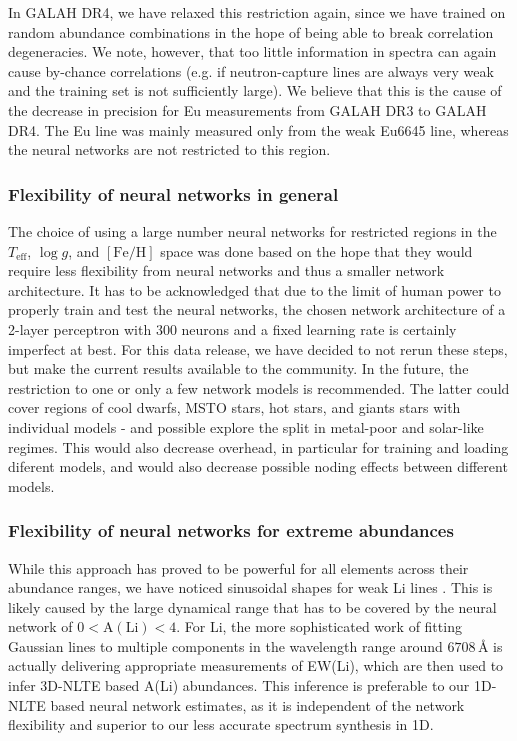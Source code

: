 \documentclass[
  journal=pasa,
  manuscript=research-paper, %
  year=2023,
  volume=37
]{cup-journal}
\newcommand{\Teff}{$T_\mathrm{eff}$\xspace}
\newcommand{\logg}{$\log g$\xspace}
\newcommand{\feh}{$\mathrm{[Fe/H]}$\xspace}
\newcommand{\TLF}{\Teff, \logg, and \feh}
\begin{document}
In GALAH DR4, we have relaxed this restriction again, since we have trained on random abundance combinations in the hope of being able to break correlation degeneracies. We note, however, that too little information in spectra can again cause by-chance correlations (e.g. if neutron-capture lines are always very weak and the training set is not sufficiently large). We believe that this is the cause of the decrease in precision for Eu measurements from GALAH DR3 to GALAH DR4. The Eu line was mainly measured only from the weak Eu6645 line, whereas the neural networks are not restricted to this region.

\subsubsection{Flexibility of neural networks in general}

The choice of using a large number neural networks for restricted regions in the \TLF space was done based on the hope that they would require less flexibility from neural networks and thus a smaller network architecture. It has to be acknowledged that due to the limit of human power to properly train and test the neural networks, the chosen network architecture of a 2-layer perceptron with 300 neurons and a fixed learning rate is certainly imperfect at best. For this data release, we have decided to not rerun these steps, but make the current results available to the community. In the future, the restriction to one or only a few network models is recommended. The latter could cover regions of cool dwarfs, MSTO stars, hot stars, and giants stars with individual models - and possible explore the split in metal-poor and solar-like regimes. This would also decrease overhead, in particular for training and loading diferent models, and would also decrease possible noding effects between different models.

\subsubsection{Flexibility of neural networks for extreme abundances}

While this approach has proved to be powerful for all elements across their abundance ranges, we have noticed sinusoidal shapes for weak Li lines \citep[see also][]{Wang2020}. This is likely caused by the large dynamical range that has to be covered by the neural network of $0 < \mathrm{A(Li)} < 4$. For Li, the more sophisticated work of fitting Gaussian lines to multiple components in the wavelength range around $6708\,\text{\AA}$ is actually delivering appropriate measurements of EW(Li), which are then used to infer 3D-NLTE based A(Li) abundances. This inference is preferable to our 1D-NLTE based neural network estimates, as it is independent of the network flexibility and superior to our less accurate spectrum synthesis in 1D.
\end{document}
